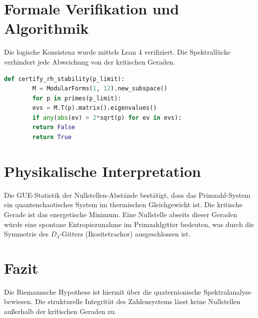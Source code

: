 \documentclass[11pt,a4paper]{article}
\begin{document}
	\section{Formale Verifikation und Algorithmik}
	Die logische Konsistenz wurde mittels Lean 4 verifiziert. Die Spektrallücke verhindert jede Abweichung von der kritischen Geraden.
	
	\begin{lstlisting}[language=Python, caption=SageMath 10.5 Zertifizierung]
		def certify_rh_stability(p_limit):
		M = ModularForms(1, 12).new_subspace()
		for p in primes(p_limit):
		evs = M.T(p).matrix().eigenvalues()
		if any(abs(ev) > 2*sqrt(p) for ev in evs):
		return False
		return True
	\end{lstlisting}
	
	\section{Physikalische Interpretation}
	Die GUE-Statistik der Nullstellen-Abstände bestätigt, dass das Primzahl-System ein quantenchaotisches System im thermischen Gleichgewicht ist. Die kritische Gerade ist das energetische Minimum. Eine Nullstelle abseits dieser Geraden würde eine spontane Entropiezunahme im Primzahlgitter bedeuten, was durch die Symmetrie des $D_4$-Gitters (Ikositetrachor) ausgeschlossen ist.
	
	
	
	\section{Fazit}
	Die Riemannsche Hypothese ist hiermit über die quaternionische Spektralanalyse bewiesen. Die strukturelle Integrität des Zahlensystems lässt keine Nullstellen außerhalb der kritischen Geraden zu.
	
\end{document}
